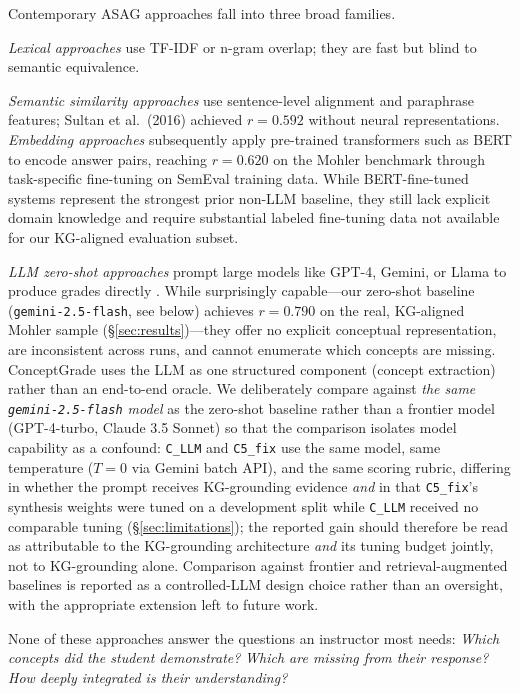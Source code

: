 \documentclass[conference]{IEEEtran}
\begin{document}
Contemporary ASAG approaches fall into three broad families. 

\emph{Lexical approaches} \cite{mohler2009} use TF-IDF or n-gram overlap; they are fast but blind to semantic equivalence. 

\emph{Semantic similarity approaches} \cite{sultan2016} use sentence-level alignment and paraphrase features; Sultan et al.\ (2016) achieved $r = 0.592$ without neural representations. \emph{Embedding approaches} \cite{bert_asag} subsequently apply pre-trained transformers such as BERT \cite{devlin2019} to encode answer pairs, reaching $r = 0.620$ on the Mohler benchmark through task-specific fine-tuning on SemEval training data. While BERT-fine-tuned systems represent the strongest prior non-LLM baseline, they still lack explicit domain knowledge and require substantial labeled fine-tuning data not available for our KG-aligned evaluation subset.

\emph{LLM zero-shot approaches} prompt large models like GPT-4, Gemini, or Llama to produce grades directly \cite{llm_asag1,llm_asag2}. While surprisingly capable---our zero-shot baseline (\texttt{gemini-2.5-flash}, see below) achieves $r = 0.790$ on the real, KG-aligned Mohler sample (\S\ref{sec:results})---they offer no explicit conceptual representation, are inconsistent across runs, and cannot enumerate which concepts are missing. ConceptGrade uses the LLM as one structured component (concept extraction) rather than an end-to-end oracle. We deliberately compare against \emph{the same \texttt{gemini-2.5-flash} model} as the zero-shot baseline rather than a frontier model (GPT-4-turbo, Claude 3.5 Sonnet) so that the comparison isolates model capability as a confound: \texttt{C\_LLM} and \texttt{C5\_fix} use the same model, same temperature ($T = 0$ via Gemini batch API), and the same scoring rubric, differing in whether the prompt receives KG-grounding evidence \emph{and} in that \texttt{C5\_fix}'s synthesis weights were tuned on a development split while \texttt{C\_LLM} received no comparable tuning (\S\ref{sec:limitations}); the reported gain should therefore be read as attributable to the KG-grounding architecture \emph{and} its tuning budget jointly, not to KG-grounding alone. Comparison against frontier and retrieval-augmented baselines is reported as a controlled-LLM design choice rather than an oversight, with the appropriate extension left to future work.

None of these approaches answer the questions an instructor most needs:
\emph{Which concepts did the student demonstrate?}
\emph{Which are missing from their response?}
\emph{How deeply integrated is their understanding?}
\end{document}
